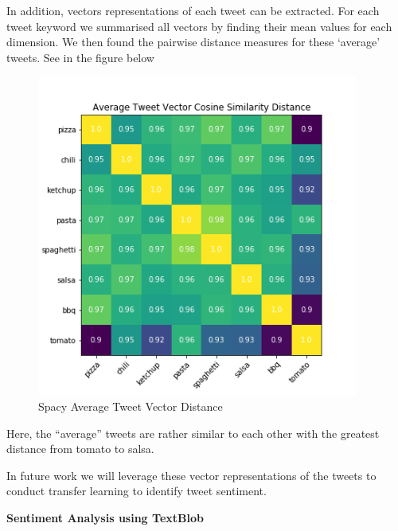 \documentclass[12pt,oneside]{chicagocapstone}
\begin{document}
In addition, vectors representations of each tweet can be extracted. For
each tweet keyword we summarised all vectors by finding their mean
values for each dimension. We then found the pairwise distance measures
for these `average' tweets. See in the figure below
\begin{figure}

{\centering \includegraphics[width=400px]{figure/Tweet_Distance_Spacy} 

}

\caption{Spacy Average Tweet Vector Distance}\label{fig:spacy-average}
\end{figure}
Here, the ``average'' tweets are rather similar to each other with the
greatest distance from tomato to salsa.

In future work we will leverage these vector representations of the
tweets to conduct transfer learning to identify tweet sentiment.

\textbf{Sentiment Analysis using TextBlob}
\end{document}
